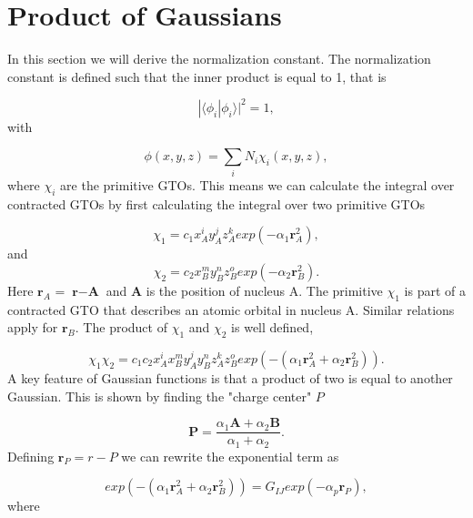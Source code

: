 \documentclass[a4paper,norsk,11pt,twoside]{report}
\begin{document}
\section{Product of Gaussians \label{overlap_section}}
In this section we will derive the normalization constant. The
normalization constant is defined such that the inner product is equal
to 1, that is

\begin{equation}
|\langle \phi_i | \phi_i \rangle|^2 = 1  ,
\end{equation}
with

\begin{equation}
\phi(x,y,z) = \sum_{i} N_i \chi_i(x,y,z)  , 
\end{equation}
where $\chi_i$ are the primitive GTOs. This means we can calculate the
integral over contracted GTOs by first calculating the integral over
two primitive GTOs 

\begin{equation}
\chi_1 = c_1 x_A^i y_A^j z_A^k exp(-\alpha_1 \textbf{r}_A^2)  ,
\end{equation}
and
\begin{equation}
\chi_2 = c_2 x_B^m y_B^n z_B^o exp(-\alpha_2 \textbf{r}_B^2)  .
\end{equation}
Here $\textbf{r}_A$ = $\textbf{r} - \textbf{A}$ and $\textbf{A}$ is the position of nucleus A. The primitive $\chi_1$ is part of a contracted GTO that describes an atomic orbital in nucleus A. Similar relations apply 
 for $\textbf{r}_B$. The product of $\chi_1$ and $\chi_2$ is well defined,

\begin{equation}
\chi_1 \chi_2 = c_1 c_2 x_A^i x_B^m y_A^j y_B^n z_A^k z_B^o exp(-(\alpha_1 \textbf{r}_A^2 + \alpha_2 \textbf{r}_B^2))  .
\end{equation}
A key feature of Gaussian functions is that a product of two is equal to another Gaussian. This is shown by finding the "charge center" $P$ 

\begin{equation}
\textbf{P} = \frac{\alpha_1 \textbf{A} + \alpha_2 \textbf{B}}{\alpha_1 + \alpha_2}  .
\end{equation}
Defining $\textbf{r}_P = r - P$ we can rewrite the exponential term as

\begin{equation}
exp(-(\alpha_1 \textbf{r}_A^2 + \alpha_2 \textbf{r}_B^2)) = G_{IJ} exp(-\alpha_p \textbf{r}_P) , 
\end{equation}
where
\end{document}
